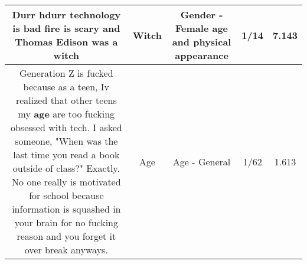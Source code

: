 \documentclass[11pt]{article}
\newlength\mylength
\begin{document}
\begin{center}
\begin{longtable}{|C{.65\mylength}|C{.30\mylength}|C{.12\mylength}|C{.12\mylength}|C{.12\mylength}|}
  \small Durr hdurr technology is bad fire is scary and Thomas Edison was a witch\normalsize   & Witch & Gender - Female age and physical appearance & 1/14 & 7.143 \\  \hline
  \small Generation Z is fucked because as a teen, Iv realized that other teens my \textbf{age} are too fucking obsessed with tech. I asked someone, "When was the last time you read a book outside of class?" Exactly. No one really is motivated for school because information is squashed in your brain for no fucking reason and you forget it over break anyways.\normalsize   & Age & Age - General & 1/62 & 1.613 \\  \hline

\end{longtable}
\end{center}
\end{document}
